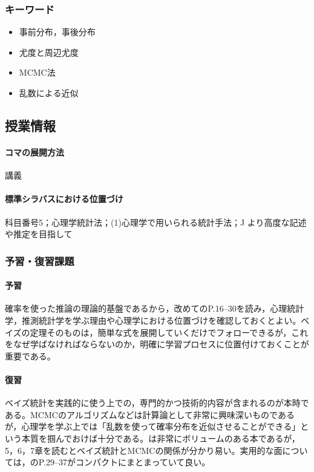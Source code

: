 \subsubsection{キーワード}
\begin{itemize}
\item 事前分布，事後分布
\item 尤度と周辺尤度
\item MCMC法
\item 乱数による近似

\end{itemize}
\subsection{授業情報}
\paragraph{コマの展開方法}
講義
\paragraph{標準シラバスにおける位置づけ}
科目番号5；心理学統計法；(1)心理学で用いられる統計手法；J より高度な記述や推定を目指して
\subsubsection{予習・復習課題}
\paragraph{予習}
確率を使った推論の理論的基盤であるから，改めて\citet{Maeda2017}のP.16--30を読み，心理統計学，推測統計学を学ぶ理由や心理学における位置づけを確認しておくとよい。ベイズの定理そのものは，簡単な式を展開していくだけでフォローできるが，これをなぜ学ばなければならないのか，明確に学習プロセスに位置付けておくことが重要である。
\paragraph{復習}
ベイズ統計を実践的に使う上での，専門的かつ技術的内容が含まれるのが本時である。MCMCのアルゴリズムなどは計算論として非常に興味深いものであるが，心理学を学ぶ上では「乱数を使って確率分布を近似させることができる」という本質を掴んでおけば十分である。\citet{Maeda2017}は非常にボリュームのある本であるが，5，6，7章を読むとベイズ統計とMCMCの関係が分かり易い。実用的な面については，\citet{豊田201606}のP.29--37がコンパクトにまとまっていて良い。